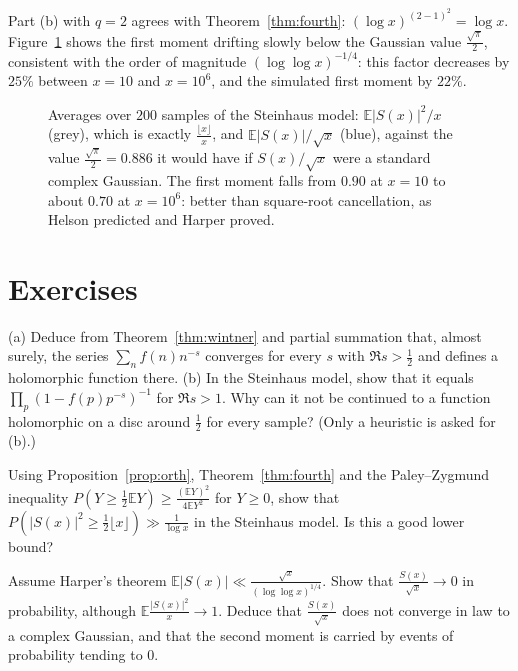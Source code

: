 Part (b) with $q=2$ agrees with Theorem~\ref{thm:fourth}: $(\log x)^{(2-1)^2}=\log x$. Figure~\ref{fig:firstmoment} shows the first moment drifting slowly below the Gaussian value $\frac{\sqrt\pi}2$, consistent with the order of magnitude $(\log\log x)^{-1/4}$: this factor decreases by $25\%$ between $x=10$ and $x=10^6$, and the simulated first moment by $22\%$.

\begin{figure}[ht]
\centering{}
\caption{Averages over $200$ samples of the Steinhaus model: $\mathbb E|S(x)|^2/x$ (grey), which is exactly $\frac{\lfloor x\rfloor}x$, and $\mathbb E|S(x)|/\sqrt x$ (blue), against the value $\frac{\sqrt\pi}2=0.886$ it would have if $S(x)/\sqrt x$ were a standard complex Gaussian. The first moment falls from $0.90$ at $x=10$ to about $0.70$ at $x=10^6$: better than square-root cancellation, as Helson predicted and Harper proved.}
\label{fig:firstmoment}
\end{figure}

\section{Exercises}

\begin{exercise}[$\star$]\label{ex:dirichlet}
(a) Deduce from Theorem~\ref{thm:wintner} and partial summation that, almost surely, the series $\sum_nf(n)n^{-s}$ converges for every $s$ with $\Re s>\frac12$ and defines a holomorphic function there. (b) In the Steinhaus model, show that it equals $\prod_p(1-f(p)p^{-s})^{-1}$ for $\Re s>1$. Why can it not be continued to a function holomorphic on a disc around $\frac12$ for every sample? (Only a heuristic is asked for (b).)
\end{exercise}

\begin{exercise}[$\star$]\label{ex:pz}
Using Proposition~\ref{prop:orth}, Theorem~\ref{thm:fourth} and the Paley--Zygmund inequality $P(Y\ge\frac12\mathbb EY)\ge\frac{(\mathbb EY)^2}{4\mathbb EY^2}$ for $Y\ge0$, show that $P(|S(x)|^2\ge\frac12\lfloor x\rfloor)\gg\frac1{\log x}$ in the Steinhaus model. Is this a good lower bound?
\end{exercise}

\begin{exercise}[$\star\star$]\label{ex:notgauss}
Assume Harper's theorem $\mathbb E|S(x)|\ll\frac{\sqrt x}{(\log\log x)^{1/4}}$. Show that $\frac{S(x)}{\sqrt x}\to0$ in probability, although $\mathbb E\frac{|S(x)|^2}x\to1$. Deduce that $\frac{S(x)}{\sqrt x}$ does not converge in law to a complex Gaussian, and that the second moment is carried by events of probability tending to $0$.
\end{exercise}

